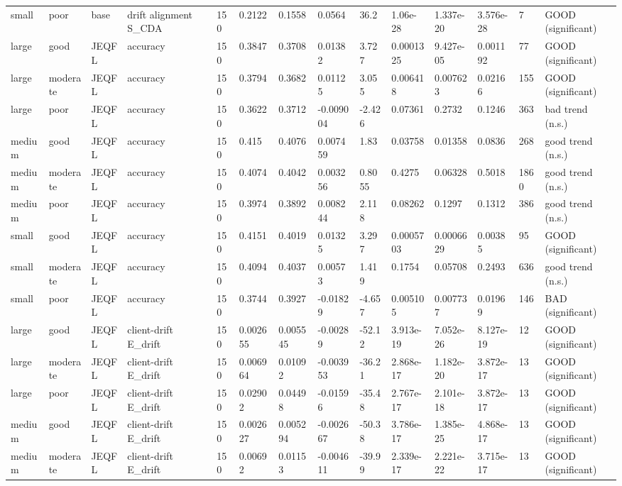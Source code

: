 \begin{table}[t]
\begin{tabular}{llllllllllllll}
small & poor & base & drift alignment S\_CDA & 150 & 0.2122 & 0.1558 & 0.0564 & 36.2 & 1.06e-28 & 1.337e-20 & 3.576e-28 & 7 & GOOD (significant) \\
large & good & JEQFL & accuracy & 150 & 0.3847 & 0.3708 & 0.01382 & 3.727 & 0.0001325 & 9.427e-05 & 0.001192 & 77 & GOOD (significant) \\
large & moderate & JEQFL & accuracy & 150 & 0.3794 & 0.3682 & 0.01125 & 3.055 & 0.006418 & 0.007623 & 0.02166 & 155 & GOOD (significant) \\
large & poor & JEQFL & accuracy & 150 & 0.3622 & 0.3712 & -0.009004 & -2.426 & 0.07361 & 0.2732 & 0.1246 & 363 & bad trend (n.s.) \\
medium & good & JEQFL & accuracy & 150 & 0.415 & 0.4076 & 0.007459 & 1.83 & 0.03758 & 0.01358 & 0.0836 & 268 & good trend (n.s.) \\
medium & moderate & JEQFL & accuracy & 150 & 0.4074 & 0.4042 & 0.003256 & 0.8055 & 0.4275 & 0.06328 & 0.5018 & 1860 & good trend (n.s.) \\
medium & poor & JEQFL & accuracy & 150 & 0.3974 & 0.3892 & 0.008244 & 2.118 & 0.08262 & 0.1297 & 0.1312 & 386 & good trend (n.s.) \\
small & good & JEQFL & accuracy & 150 & 0.4151 & 0.4019 & 0.01325 & 3.297 & 0.0005703 & 0.0006629 & 0.00385 & 95 & GOOD (significant) \\
small & moderate & JEQFL & accuracy & 150 & 0.4094 & 0.4037 & 0.00573 & 1.419 & 0.1754 & 0.05708 & 0.2493 & 636 & good trend (n.s.) \\
small & poor & JEQFL & accuracy & 150 & 0.3744 & 0.3927 & -0.01829 & -4.657 & 0.005105 & 0.007737 & 0.01969 & 146 & BAD (significant) \\
large & good & JEQFL & client-drift E\_drift & 150 & 0.002655 & 0.005545 & -0.00289 & -52.12 & 3.913e-19 & 7.052e-26 & 8.127e-19 & 12 & GOOD (significant) \\
large & moderate & JEQFL & client-drift E\_drift & 150 & 0.006964 & 0.01092 & -0.003953 & -36.21 & 2.868e-17 & 1.182e-20 & 3.872e-17 & 13 & GOOD (significant) \\
large & poor & JEQFL & client-drift E\_drift & 150 & 0.02902 & 0.04498 & -0.01596 & -35.48 & 2.767e-17 & 2.101e-18 & 3.872e-17 & 13 & GOOD (significant) \\
medium & good & JEQFL & client-drift E\_drift & 150 & 0.002627 & 0.005294 & -0.002667 & -50.38 & 3.786e-17 & 1.385e-25 & 4.868e-17 & 13 & GOOD (significant) \\
medium & moderate & JEQFL & client-drift E\_drift & 150 & 0.00692 & 0.01153 & -0.004611 & -39.99 & 2.339e-17 & 2.221e-22 & 3.715e-17 & 13 & GOOD (significant) \\

\end{tabular}
\end{table}

